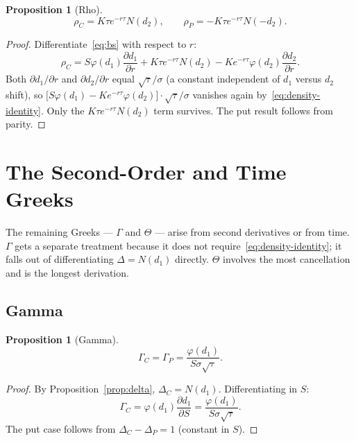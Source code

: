 \documentclass[11pt,a4paper]{article}
\theoremstyle{plain}
\newtheorem{proposition}[theorem]{Proposition}
\theoremstyle{definition}
\theoremstyle{remark}
\begin{document}
\begin{proposition}[Rho]
\label{prop:rho}
\[
    \rho_C = K \tau e^{-r\tau} N(d_2),
    \qquad
    \rho_P = -K \tau e^{-r\tau} N(-d_2).
\]
\end{proposition}

\begin{proof}
Differentiate~\eqref{eq:bs} with respect to \(r\):
\[
    \rho_C
    = S \varphi(d_1) \frac{\partial d_1}{\partial r}
        + K \tau e^{-r\tau} N(d_2)
        - K e^{-r\tau} \varphi(d_2) \frac{\partial d_2}{\partial r}.
\]
Both \(\partial d_1 / \partial r\) and \(\partial d_2 / \partial r\)
equal \(\sqrt{\tau}/\sigma\) (a constant independent of \(d_1\) versus
\(d_2\) shift), so
\(\bigl[S\varphi(d_1) - K e^{-r\tau}\varphi(d_2)\bigr] \cdot \sqrt{\tau}/\sigma\)
vanishes again by~\eqref{eq:density-identity}. Only the
\(K\tau e^{-r\tau} N(d_2)\) term survives. The put result follows from
parity.
\end{proof}

\section{The Second-Order and Time Greeks}

The remaining Greeks --- \(\Gamma\) and \(\Theta\) --- arise from
second derivatives or from time. \(\Gamma\) gets a separate
treatment because it does not require~\eqref{eq:density-identity}; it
falls out of differentiating \(\Delta = N(d_1)\) directly. \(\Theta\)
involves the most cancellation and is the longest derivation.

\subsection{Gamma}

\begin{proposition}[Gamma]
\label{prop:gamma}
\[
    \Gamma_C = \Gamma_P = \frac{\varphi(d_1)}{S \sigma \sqrt{\tau}}.
\]
\end{proposition}

\begin{proof}
By Proposition~\ref{prop:delta}, \(\Delta_C = N(d_1)\). Differentiating
in \(S\):
\[
    \Gamma_C = \varphi(d_1) \frac{\partial d_1}{\partial S}
             = \frac{\varphi(d_1)}{S \sigma \sqrt{\tau}}.
\]
The put case follows from \(\Delta_C - \Delta_P = 1\) (constant in
\(S\)).
\end{proof}
\end{document}
